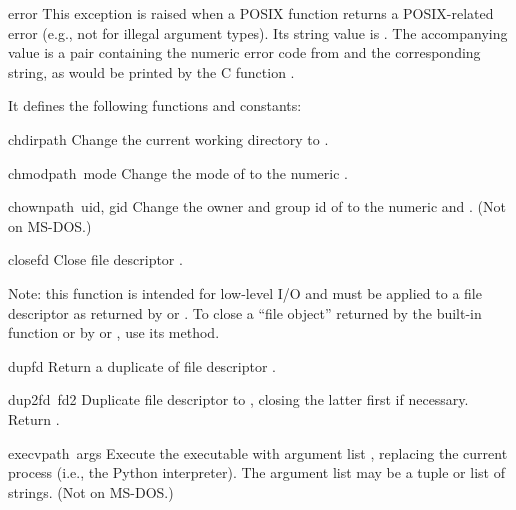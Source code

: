 \renewcommand{\indexsubitem}{(exception in module posix)}
\begin{excdesc}{error}
This exception is raised when a POSIX function returns a
POSIX-related error (e.g., not for illegal argument types).  Its
string value is .  The accompanying value is a
pair containing the numeric error code from  and the
corresponding string, as would be printed by the C function
.
\end{excdesc}

It defines the following functions and constants:

\renewcommand{\indexsubitem}{(in module posix)}
\begin{funcdesc}{chdir}{path}
Change the current working directory to .
\end{funcdesc}

\begin{funcdesc}{chmod}{path\, mode}
Change the mode of  to the numeric .
\end{funcdesc}

\begin{funcdesc}{chown}{path\, uid, gid}
Change the owner and group id of  to the numeric 
and .
(Not on MS-DOS.)
\end{funcdesc}

\begin{funcdesc}{close}{fd}
Close file descriptor .

Note: this function is intended for low-level I/O and must be applied
to a file descriptor as returned by  or
.  To close a ``file object'' returned by the
built-in function  or by  or
, use its  method.
\end{funcdesc}

\begin{funcdesc}{dup}{fd}
Return a duplicate of file descriptor .
\end{funcdesc}

\begin{funcdesc}{dup2}{fd\, fd2}
Duplicate file descriptor  to , closing the latter
first if necessary.  Return .
\end{funcdesc}

\begin{funcdesc}{execv}{path\, args}
Execute the executable  with argument list ,
replacing the current process (i.e., the Python interpreter).
The argument list may be a tuple or list of strings.
(Not on MS-DOS.)
\end{funcdesc}

